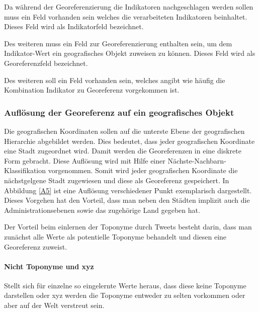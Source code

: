 					Da während der Georeferenzierung die Indikatoren nachgeschlagen werden sollen muss ein Feld vorhanden sein welches die verarbeiteten Indikatoren beinhaltet.
					Dieses Feld wird als Indikatorfeld bezeichnet. 

					Des weiteren muss ein Feld zur Georeferenzierung enthalten sein, um dem Indikator-Wert ein geografisches Objekt zuweisen zu können. 
					Dieses Feld wird als Georeferenzfeld bezeichnet. 

					Des weiteren soll ein Feld vorhanden sein, welches angibt wie häufig die Kombination Indikator zu Georeferenz vorgekommen ist. 


				\subsubsection{Auflösung der Georeferenz auf ein geografisches Objekt}



				Die geografischen Koordinaten sollen auf die unterste Ebene der geografischen Hierarchie abgebildet werden. 
				Dies bedeutet, dass jeder geografischen Koordinate eine Stadt zugeordnet wird.
				Damit werden die Georeferenzen in eine diskrete Form gebracht.  
				Diese Auflösung wird mit Hilfe einer Nächste-Nachbarn-Klassifikation vorgenommen.
				Somit wird jeder geografischen Koordinate die nächstgelgene Stadt zugewiesen und diese als Georeferenz gespeichert. 
				In Abbildung \ref{A5} ist eine Auflösung verschiedener Punkt exemplarisch dargestellt. 
				Dieses Vorgehen hat den Vorteil, dass man neben den Städten implizit auch die Administrationsebenen sowie das zugehörige Land gegeben hat.













				Der Vorteil beim einlernen der Toponyme durch Tweets besteht darin, dass man zunächst alle Werte als potentielle Toponyme behandelt und diesen eine Georeferenz zuweist.

				\paragraph{Nicht Toponyme und xyz} 
				Stellt sich für einzelne so eingelernte Werte heraus, dass diese keine Toponyme darstellen oder xyz werden die Toponyme entweder zu selten vorkommen oder aber auf der Welt verstreut sein.   

